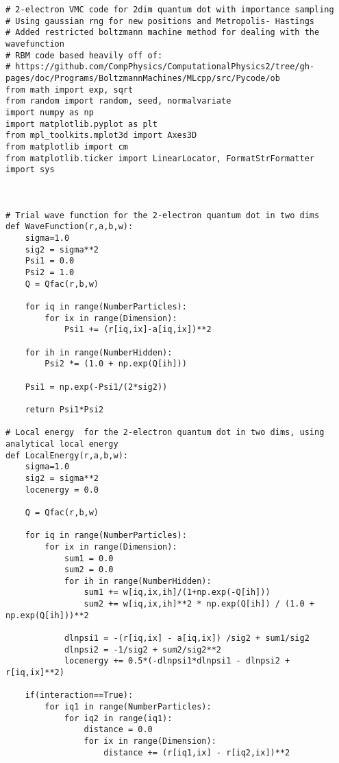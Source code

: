 \documentclass[%
oneside,                 %
final,                   %
10pt]{article}
\begin{document}
\begin{verbatim}
# 2-electron VMC code for 2dim quantum dot with importance sampling
# Using gaussian rng for new positions and Metropolis- Hastings 
# Added restricted boltzmann machine method for dealing with the wavefunction
# RBM code based heavily off of:
# https://github.com/CompPhysics/ComputationalPhysics2/tree/gh-pages/doc/Programs/BoltzmannMachines/MLcpp/src/Pycode/ob
from math import exp, sqrt
from random import random, seed, normalvariate
import numpy as np
import matplotlib.pyplot as plt
from mpl_toolkits.mplot3d import Axes3D
from matplotlib import cm
from matplotlib.ticker import LinearLocator, FormatStrFormatter
import sys



# Trial wave function for the 2-electron quantum dot in two dims
def WaveFunction(r,a,b,w):
    sigma=1.0
    sig2 = sigma**2
    Psi1 = 0.0
    Psi2 = 1.0
    Q = Qfac(r,b,w)
    
    for iq in range(NumberParticles):
        for ix in range(Dimension):
            Psi1 += (r[iq,ix]-a[iq,ix])**2
            
    for ih in range(NumberHidden):
        Psi2 *= (1.0 + np.exp(Q[ih]))
        
    Psi1 = np.exp(-Psi1/(2*sig2))

    return Psi1*Psi2

# Local energy  for the 2-electron quantum dot in two dims, using analytical local energy
def LocalEnergy(r,a,b,w):
    sigma=1.0
    sig2 = sigma**2
    locenergy = 0.0
    
    Q = Qfac(r,b,w)

    for iq in range(NumberParticles):
        for ix in range(Dimension):
            sum1 = 0.0
            sum2 = 0.0
            for ih in range(NumberHidden):
                sum1 += w[iq,ix,ih]/(1+np.exp(-Q[ih]))
                sum2 += w[iq,ix,ih]**2 * np.exp(Q[ih]) / (1.0 + np.exp(Q[ih]))**2
    
            dlnpsi1 = -(r[iq,ix] - a[iq,ix]) /sig2 + sum1/sig2
            dlnpsi2 = -1/sig2 + sum2/sig2**2
            locenergy += 0.5*(-dlnpsi1*dlnpsi1 - dlnpsi2 + r[iq,ix]**2)
            
    if(interaction==True):
        for iq1 in range(NumberParticles):
            for iq2 in range(iq1):
                distance = 0.0
                for ix in range(Dimension):
                    distance += (r[iq1,ix] - r[iq2,ix])**2
                    

\end{verbatim}
\end{document}

